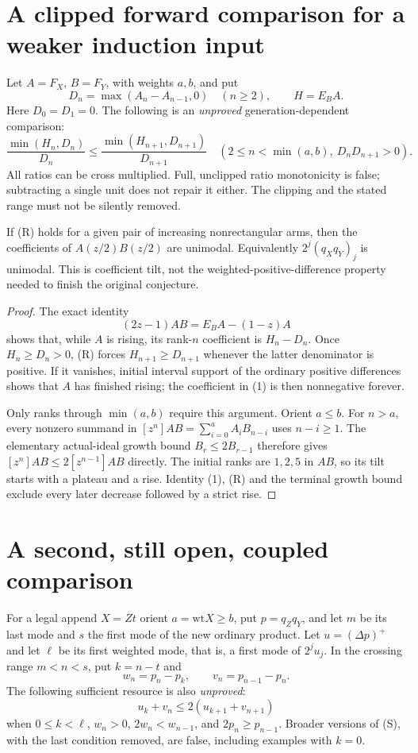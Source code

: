 \section{A clipped forward comparison for a weaker induction input}
Let $A=F_X$, $B=F_Y$, with weights $a,b$, and put
\[
 D_n=\max(A_n-A_{n-1},0)\quad(n\ge2),\qquad H=E_B A.
\]
Here $D_0=D_1=0$. The following is an \emph{unproved}
generation-dependent comparison:
\[
 \frac{\min(H_n,D_n)}{D_n}\le
 \frac{\min(H_{n+1},D_{n+1})}{D_{n+1}}
 \quad\left(2\le n<\min(a,b),\ D_nD_{n+1}>0\right).
                                                        \tag{R}
\]
All ratios can be cross multiplied. Full, unclipped ratio
monotonicity is false; subtracting a single unit does not
repair it either. The clipping and the stated range must
not be silently removed.

\begin{proposition}
If (R) holds for a given pair of increasing nonrectangular
arms, then the coefficients of $A(z/2)B(z/2)$ are unimodal.
Equivalently $2^j(q_Xq_Y)_j$ is unimodal.
This is coefficient tilt, not the weighted-positive-difference
property needed to finish the original conjecture.
\end{proposition}
\begin{proof}
The exact identity
\[
 (2z-1)AB=E_B A-(1-z)A                              \tag{1}
\]
shows that, while $A$ is rising, its rank-$n$ coefficient
is $H_n-D_n$. Once $H_n\ge D_n>0$, (R) forces
$H_{n+1}\ge D_{n+1}$ whenever the latter denominator is
positive. If it vanishes, initial interval support of the
ordinary positive differences shows that $A$ has finished
rising; the coefficient in (1) is then nonnegative forever.

Only ranks through $\min(a,b)$ require this argument.
Orient $a\le b$. For $n>a$, every nonzero summand in
$[z^n]AB=\sum_{i=0}^{a}A_iB_{n-i}$ uses $n-i\ge1$.
The elementary actual-ideal growth bound
$B_r\le2B_{r-1}$ therefore gives
$[z^n]AB\le2[z^{n-1}]AB$ directly. The initial ranks
are $1,2,5$ in $AB$, so its tilt starts with a plateau
and a rise. Identity (1), (R) and the terminal growth bound
exclude every later decrease followed by a strict rise.
\end{proof}

\section{A second, still open, coupled comparison}
For a legal append $X=Zt$ orient $a=\mathrm{wt}X\ge b$,
put $p=q_Zq_Y$, and let $m$ be its last mode and $s$ the
first mode of the new ordinary product. Let
$u=(\Delta p)^+$ and let $\ell$ be its first weighted
mode, that is, a first mode of $2^j u_j$.
In the crossing range $m<n<s$, put $k=n-t$ and
\[
 w_n=p_n-p_k,\qquad v_n=p_{n-1}-p_n.
\]
The following sufficient resource is also \emph{unproved}:
\[
 u_k+v_n\le2(u_{k+1}+v_{n+1})                       \tag{S}
\]
when $0\le k<\ell$, $w_n>0$,
$2w_n<w_{n-1}$, and $2p_n\ge p_{n-1}$.
Broader versions of (S), with the last condition removed,
are false, including examples with $k=0$.

